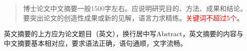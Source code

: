 \begin{abstract}

博士论文中文摘要一般1500字左右。应说明研究目的、方法、成果和结论。要突出论文的创造性成果或新的见解，语言力求精练。\textcolor{red}{关键词不超过5个。}


\end{abstract}



\begin{englishabstract}

英文摘要的上方应为论文题目（英文），换行居中写Abstract，英文摘要的内容与中文摘要基本相对应，要求语法正确，语句通顺，文字流畅。

\end{englishabstract}